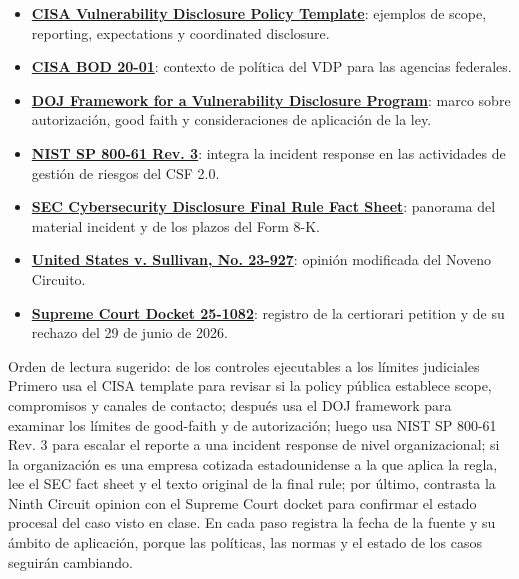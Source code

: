 {\small
\begin{itemize}[nosep,leftmargin=*]
  \item \href{https://www.cisa.gov/vulnerability-disclosure-policy-template}{\textbf{CISA Vulnerability Disclosure Policy Template}}: ejemplos de scope, reporting, expectations y coordinated disclosure.
  \item \href{https://www.cisa.gov/news-events/directives/bod-20-01-develop-and-publish-vulnerability-disclosure-policy}{\textbf{CISA BOD 20-01}}: contexto de política del VDP para las agencias federales.
  \item \href{https://www.justice.gov/criminal/criminal-ccips/page/file/983996/dl}{\textbf{DOJ Framework for a Vulnerability Disclosure Program}}: marco sobre autorización, good faith y consideraciones de aplicación de la ley.
  \item \href{https://csrc.nist.gov/pubs/sp/800/61/r3/final}{\textbf{NIST SP 800-61 Rev. 3}}: integra la incident response en las actividades de gestión de riesgos del CSF 2.0.
  \item \href{https://www.sec.gov/files/33-11216-fact-sheet.pdf}{\textbf{SEC Cybersecurity Disclosure Final Rule Fact Sheet}}: panorama del material incident y de los plazos del Form 8-K.
  \item \href{https://cdn.ca9.uscourts.gov/datastore/opinions/2025/11/12/23-927.pdf}{\textbf{United States v. Sullivan, No. 23-927}}: opinión modificada del Noveno Circuito.
  \item \href{https://www.supremecourt.gov/docket/docketfiles/html/public/25-1082.html}{\textbf{Supreme Court Docket 25-1082}}: registro de la certiorari petition y de su rechazo del 29 de junio de 2026.
\end{itemize}
}

\begin{knowledgebox}{Orden de lectura sugerido: de los controles ejecutables a los límites judiciales}
Primero usa el CISA template para revisar si la policy pública establece scope, compromisos y canales de contacto; después usa el DOJ framework para examinar los límites de good-faith y de autorización; luego usa NIST SP 800-61 Rev. 3 para escalar el reporte a una incident response de nivel organizacional; si la organización es una empresa cotizada estadounidense a la que aplica la regla, lee el SEC fact sheet y el texto original de la final rule; por último, contrasta la Ninth Circuit opinion con el Supreme Court docket para confirmar el estado procesal del caso visto en clase. En cada paso registra la fecha de la fuente y su ámbito de aplicación, porque las políticas, las normas y el estado de los casos seguirán cambiando.
\end{knowledgebox}

